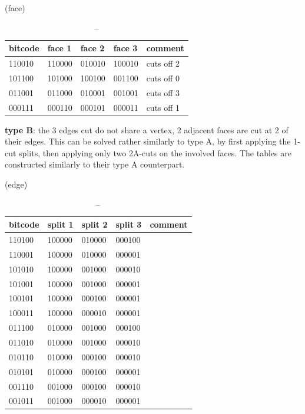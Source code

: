 (face)\\
\begin{table}[]
\begin{tabular}{|l|l|l|l|l|}
\hline
bitcode & face 1 & face 2 & face 3 & comment    \\ \hline
110010  & 110000 & 010010 & 100010 & cuts off 2 \\ \hline
101100  & 101000 & 100100 & 001100 & cuts off 0 \\ \hline
011001  & 011000 & 010001 & 001001 & cuts off 3 \\ \hline
000111  & 000110 & 000101 & 000011 & cuts off 1 \\ \hline
\end{tabular}
\caption{--}
\end{table}


\textbf{type B}: the 3 edges cut do not share a vertex, 2 adjacent faces are cut at 2 of their edges. This can be solved rather similarly to type A, by first applying the 1-cut splits, then applying only two 2A-cuts on the involved faces. The tables are constructed similarly to their type A counterpart.

(edge)\\
\begin{table}[]
\begin{tabular}{|l|l|l|l|l|}
\hline
bitcode & split 1 & split 2 & split 3 & comment \\ \hline
110100  & 100000  & 010000  & 000100  &         \\ \hline
110001  & 100000  & 010000  & 000001  &         \\ \hline
101010  & 100000  & 001000  & 000010  &         \\ \hline
101001  & 100000  & 001000  & 000001  &         \\ \hline
100101  & 100000  & 000100  & 000001  &         \\ \hline
100011  & 100000  & 000010  & 000001  &         \\ \hline
011100  & 010000  & 001000  & 000100  &         \\ \hline
011010  & 010000  & 001000  & 000010  &         \\ \hline
010110  & 010000  & 000100  & 000010  &         \\ \hline
010101  & 010000  & 000100  & 000001  &         \\ \hline
001110  & 001000  & 000100  & 000010  &         \\ \hline
001011  & 001000  & 000010  & 000001  &         \\ \hline
\end{tabular}
\caption{--}
\end{table}

